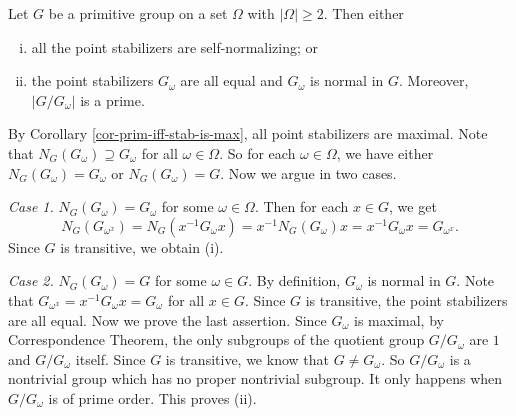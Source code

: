 \begin{lemma} \label{lemma-not-regular-iff-stab-self-normalizing}
	Let $G$ be a primitive group on a set $\Omega$ with $|\Omega|\geq 2$. Then either
	\begin{enumerate}[(i)]
		\item all the point stabilizers are self-normalizing; or
		\item the point stabilizers $G_\omega$ are all equal and $G_\omega$ is normal in $G$. Moreover, $|G/G_\omega|$ is a prime.
	\end{enumerate}
\end{lemma}
\begin{sketch}
	By Corollary \ref{cor-prim-iff-stab-is-max}, all point stabilizers are maximal. Note that $N_G(G_\omega) \supseteq G_\omega$ for all $\omega\in \Omega$. So for each $\omega\in \Omega$, we have either $N_G(G_\omega) = G_\omega$ or $N_G(G_\omega) = G$. Now we argue in two cases.
	
\textit{Case 1.} $N_G(G_\omega) = G_\omega$ for some $\omega\in\Omega$. Then for each $x\in G$, we get
\begin{equation*}
	N_G(G_{\omega^x}) = N_G(x^{-1}G_{\omega}x) = x^{-1}N_G(G_{\omega})x = x^{-1}G_{\omega}x =G_{\omega^x}.
\end{equation*}
Since $G$ is transitive, we obtain (i).

\textit{Case 2.} $N_G(G_\omega) = G$ for some $\omega\in G$. By definition, $G_\omega$ is normal in $G$.  Note that $G_{\omega^x} = x^{-1}G_\omega x = G_\omega$ for all $x\in G$. Since $G$ is transitive, the point stabilizers are all equal. Now we prove the last assertion. Since $G_\omega$ is maximal, by Correspondence Theorem, the only subgroups of the quotient group $G/G_\omega$ are $1$ and $G/G_\omega$ itself. Since $G$ is transitive, we know that $G\neq G_\omega$. So $G/G_\omega$ is a nontrivial group which has no proper nontrivial subgroup. It only happens when $G/G_\omega$ is  of prime order. This proves (ii).
\end{sketch}

